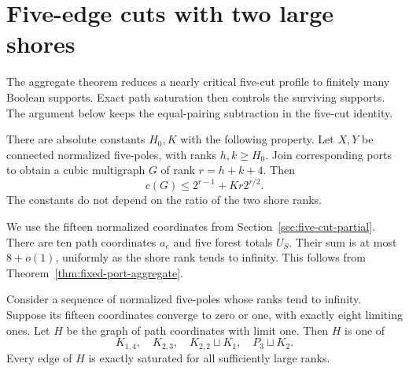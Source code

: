 \section{Five-edge cuts with two large shores}
\label{sec:five-cut-large-shores}

The aggregate theorem reduces a nearly critical five-cut profile to finitely many Boolean supports.
Exact path saturation then controls the surviving supports.
The argument below keeps the equal-pairing subtraction in the five-cut identity.

\begin{theorem}
\label{thm:large-five-cut-sharp-order}
There are absolute constants $H_0,K$ with the following property.
Let $X,Y$ be connected normalized five-poles, with ranks $h,k\ge H_0$.
Join corresponding ports to obtain a cubic multigraph $G$ of rank $r=h+k+4$.
Then
\[
 c(G)\le 2^{r-1}+Kr2^{r/2}.
\]
The constants do not depend on the ratio of the two shore ranks.
\end{theorem}

We use the fifteen normalized coordinates from Section~\ref{sec:five-cut-partial}.
There are ten path coordinates $a_e$ and five forest totals $U_S$.
Their sum is at most $8+o(1)$, uniformly as the shore rank tends to infinity.
This follows from Theorem~\ref{thm:fixed-port-aggregate}.

\begin{lemma}
\label{lem:five-pole-boolean-supports}
Consider a sequence of normalized five-poles whose ranks tend to infinity.
Suppose its fifteen coordinates converge to zero or one, with exactly eight limiting ones.
Let $H$ be the graph of path coordinates with limit one.
Then $H$ is one of
\[
 K_{1,4},\quad K_{2,3},\quad K_{2,2}\sqcup K_1,
 \quad P_3\sqcup K_2.
\]
Every edge of $H$ is exactly saturated for all sufficiently large ranks.
\end{lemma}

